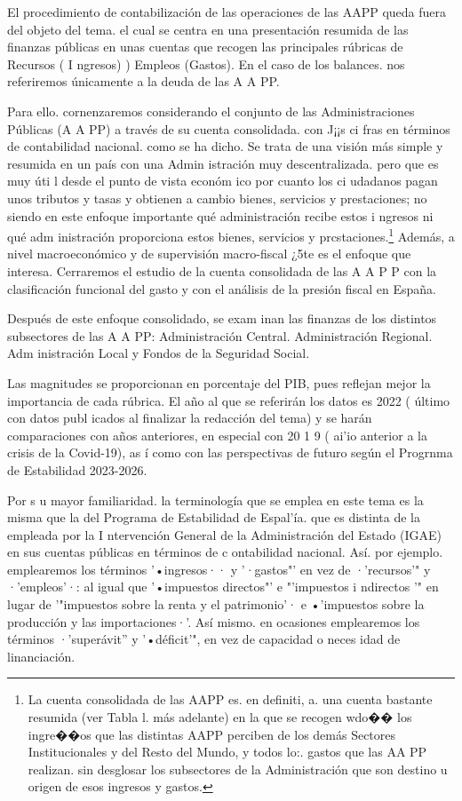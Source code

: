 \documentclass[10pt,a4paper]{article}
\begin{document}
El procedimiento de contabilización de las operaciones de las AAPP queda fuera del objeto del tema. el cual se centra en una presentación resumida de las finanzas públicas en unas cuentas que recogen las principales rúbricas de Recursos ( I ngresos) ) Empleos (Gastos). En el caso de los balances. nos referiremos únicamente a la deuda de las A A PP.

Para ello. cornenzaremos considerando el conjunto de las Administraciones Públicas (A A PP) a través de su cuenta consolidada. con J¡¡s ci fras en términos de contabilidad nacional. como se ha dicho. Se trata de una visión más simple y resumida en un país con una Admin istración muy descentralizada. pero que es muy úti l desde el punto de vista económ ico por cuanto los ci udadanos pagan unos tributos y tasas y obtienen a cambio bienes, servicios y prestaciones; no siendo en este enfoque importante qué administración recibe estos i ngresos ni qué adm inistración proporciona estos bienes, servicios y prcstaciones.\footnote{%
    La cuenta consolidada de las AAPP es. en definiti, a. una cuenta bastante resumida (ver Tabla l. más adelante) en la que se recogen wdo�� los ingre��os que las distintas AAPP perciben de los demás Sectores Institucionales y del Resto del Mundo, y todos lo:. gastos que las AA PP realizan. sin desglosar los subsectores de la Administración que son destino u origen de esos ingresos y gastos.
} Además, a nivel macroeconómico y de supervisión macro-fiscal ¿5te es el enfoque que interesa. Cerraremos el estudio de la cuenta consolidada de las A A P P con la clasificación funcional del gasto y con el análisis de la presión fiscal en España.

Después de este enfoque consolidado, se exam inan las finanzas de los distintos subsectores de las A A PP: Administración Central. Administración Regional. Adm inistración Local y Fondos de la Seguridad Social.

Las magnitudes se proporcionan en porcentaje del PIB, pues reflejan mejor la importancia de cada rúbrica. El año al que se referirán los datos es 2022 ( último con datos publ icados al finalizar la redacción del tema) y se harán comparaciones con años anteriores, en especial con 20 1 9 ( ai'io anterior a la crisis de la Covid-19), as í como con las perspectivas de futuro según el Progrnma de Estabilidad 2023-2026.

Por s u mayor familiaridad. la terminología que se emplea en este tema es la misma que la del Programa de Estabilidad de Espal'ía. que es distinta de la empleada por la I ntervención General de la Administración del Estado (IGAE) en sus cuentas públicas en términos de c ontabilidad nacional. Así. por ejemplo. emplearemos los términos '•ingresos·· y '·gastos"' en vez de ·'recursos'" y ·'empleos'·: al igual que '•impuestos directos"' e "'impuestos i ndirectos '" en lugar de '"impuestos sobre la renta y el patrimonio'· e •'impuestos sobre la producción y las importaciones·'. Así mismo. en ocasiones emplearemos los términos ·'superávit'' y '•déficit'", en vez de capacidad o neces idad de linanciación.
\end{document}
